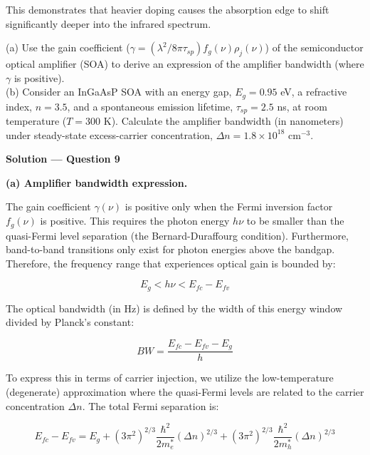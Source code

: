This demonstrates that heavier doping causes the absorption edge to shift significantly deeper into the infrared spectrum.

\begin{question}[Question 9]
(a) Use the gain coefficient ($\gamma = (\lambda^2/8\pi\tau_{sp}) f_g(\nu) \rho_j(\nu)$) of the semiconductor optical amplifier (SOA) to derive an expression of the amplifier bandwidth (where $\gamma$ is positive).\\
(b) Consider an InGaAsP SOA with an energy gap, $E_g = 0.95$ eV, a refractive index, $n = 3.5$, and a spontaneous emission lifetime, $\tau_{sp} = 2.5$ ns, at room temperature ($T = 300$ K). Calculate the amplifier bandwidth (in nanometers) under steady-state excess-carrier concentration, $\Delta n = 1.8 \times 10^{18}$ cm$^{-3}$.
\end{question}

\textbf{\large Solution --- Question 9}

\textbf{(a) Amplifier bandwidth expression.}

The gain coefficient $\gamma(\nu)$ is positive only when the Fermi inversion factor $f_g(\nu)$ is positive. This requires the photon energy $h\nu$ to be smaller than the quasi-Fermi level separation (the Bernard-Duraffourg condition). Furthermore, band-to-band transitions only exist for photon energies above the bandgap. Therefore, the frequency range that experiences optical gain is bounded by:

\begin{equation*}
  E_g < h\nu < E_{fc} - E_{fv}
\end{equation*}

The optical bandwidth (in Hz) is defined by the width of this energy window divided by Planck's constant:

\begin{equation*}
  BW = \frac{E_{fc} - E_{fv} - E_g}{h}
\end{equation*}

To express this in terms of carrier injection, we utilize the low-temperature (degenerate) approximation where the quasi-Fermi levels are related to the carrier concentration $\Delta n$. The total Fermi separation is:

\begin{equation*}
  E_{fc} - E_{fv} = E_g + (3\pi^2)^{2/3} \frac{\hbar^2}{2 m_e^*} (\Delta n)^{2/3} + (3\pi^2)^{2/3} \frac{\hbar^2}{2 m_h^*} (\Delta n)^{2/3}
\end{equation*}

